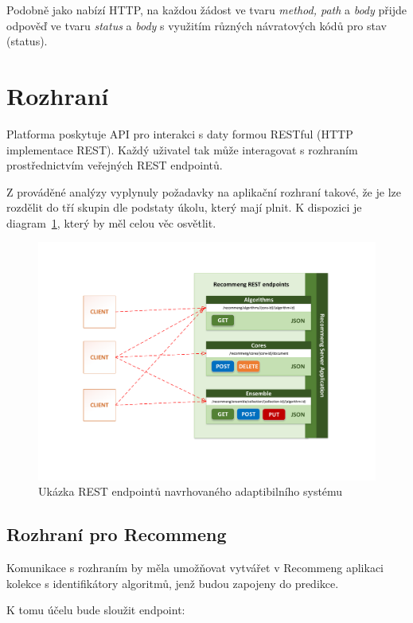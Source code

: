 \documentclass[thesis=M,czech]{FITthesis}[2014/05/07]
\begin{document}
Podobně jako nabízí HTTP, na každou žádost ve tvaru \emph{method, path} a \emph{body} přijde odpověď ve tvaru \emph{status} a \emph{body} s využitím různých návratových kódů pro stav (status).

\section{Rozhraní}

Platforma poskytuje API pro interakci s daty formou RESTful (HTTP implementace REST). Každý uživatel tak může interagovat s rozhraním prostřednictvím veřejných REST endpointů.

Z prováděné analýzy vyplynuly požadavky na aplikační rozhraní takové, že je lze rozdělit do tří skupin dle podstaty úkolu, který mají plnit. K dispozici je diagram~\ref{fig:rest}, který by měl celou věc osvětlit. 

\begin{figure}\centering
	\includegraphics[width=1.0\textwidth]{obr/DIPLOMKA_rest.pdf}
 	\caption[Ukázka REST endpointů navrhovaného adaptibilního systému]{Ukázka REST endpointů navrhovaného adaptibilního systému}\label{fig:rest}
\end{figure}	

\subsection{Rozhraní pro Recommeng}

Komunikace s rozhraním by měla umožňovat vytvářet v Recommeng aplikaci kolekce s identifikátory algoritmů, jenž budou zapojeny do predikce. 

K tomu účelu bude sloužit endpoint:
\end{document}
